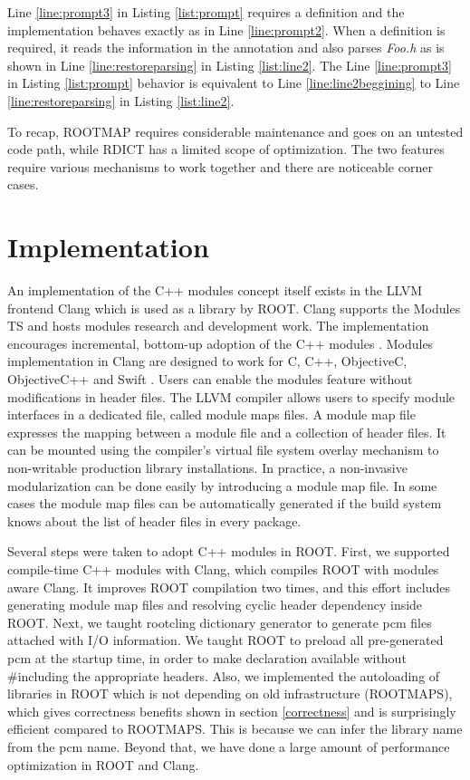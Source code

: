 \documentclass{webofc}
\begin{document}
Line \ref{line:prompt3} in Listing \ref{list:prompt} requires a definition and the implementation behaves exactly as in Line \ref{line:prompt2}. When a definition is required, it reads the information in the annotation and also parses {\it Foo.h} as is shown in Line \ref{line:restoreparsing} in Listing \ref{list:line2}. The Line \ref{line:prompt3} in Listing \ref{list:prompt} behavior is equivalent to Line \ref{line:line2beggining} to Line \ref{line:restoreparsing} in Listing \ref{list:line2}.

To recap, ROOTMAP requires considerable maintenance and goes on an untested code path, while RDICT has a limited scope of optimization. The two features require various mechanisms to work together and there are noticeable corner cases.

\section{Implementation}
\label{implementation}

An implementation of the C++ modules concept itself exists in the LLVM frontend Clang \cite{clang-modules-doc} which is used as a library by ROOT. Clang supports the Modules TS and hosts modules research and development work. The implementation encourages incremental, bottom-up adoption of the C++ modules \cite{Smith-cppcon}. Modules implementation in Clang are designed to work for C, C++, ObjectiveC, ObjectiveC++ and Swift \cite{Moduralize-doc}. Users can enable the modules feature without modifications in header files. The LLVM compiler allows users to specify module interfaces in a dedicated file, called module maps files. A module map file expresses the mapping between a module file and a collection of header files. It can be mounted using the compiler’s virtual file system overlay mechanism to non-writable production library installations. In practice, a non-invasive modularization can be done easily by introducing a module map file. In some cases the module map files can be automatically generated if the build system knows about the list of header files in every package.

Several steps were taken to adopt C++ modules in ROOT. First, we supported compile-time C++ modules with Clang, which compiles ROOT with modules aware Clang. It improves ROOT compilation two times, and this effort includes generating module map files and resolving cyclic header dependency inside ROOT. Next, we taught rootcling dictionary generator to generate pcm files attached with I/O information. We taught ROOT to preload all pre-generated pcm at the startup time, in order to make declaration available without \#including the appropriate headers. Also, we implemented the autoloading of libraries in ROOT which is not depending on old infrastructure (ROOTMAPS), which gives correctness benefits shown in section \ref{correctness} and is surprisingly efficient compared to ROOTMAPS. This is because we can infer the library name from the pcm name. Beyond that, we have done a large amount of performance optimization in ROOT and Clang.
\end{document}

